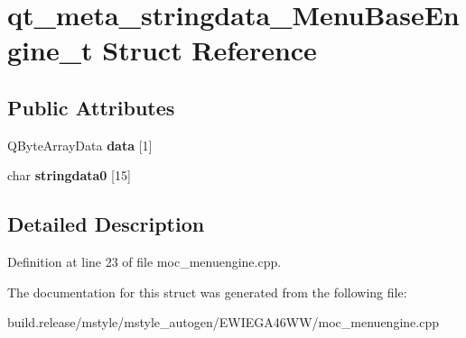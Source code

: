 \hypertarget{structqt__meta__stringdata___menu_base_engine__t}{}\section{qt\+\_\+meta\+\_\+stringdata\+\_\+\+Menu\+Base\+Engine\+\_\+t Struct Reference}
\label{structqt__meta__stringdata___menu_base_engine__t}
\subsection*{Public Attributes}
\begin{DoxyCompactItemize}
\item 
\mbox{\label{structqt__meta__stringdata___menu_base_engine__t_abe956cad040530587163274ef42659c9}} 
Q\+Byte\+Array\+Data {\bfseries data} \mbox{[}1\mbox{]}
\item 
\mbox{\label{structqt__meta__stringdata___menu_base_engine__t_aa74f3429a107961185eb85781b846d80}} 
char {\bfseries stringdata0} \mbox{[}15\mbox{]}
\end{DoxyCompactItemize}


\subsection{Detailed Description}


Definition at line 23 of file moc\+\_\+menuengine.\+cpp.



The documentation for this struct was generated from the following file\+:\begin{DoxyCompactItemize}
\item 
build.\+release/mstyle/mstyle\+\_\+autogen/\+E\+W\+I\+E\+G\+A46\+W\+W/moc\+\_\+menuengine.\+cpp\end{DoxyCompactItemize}
